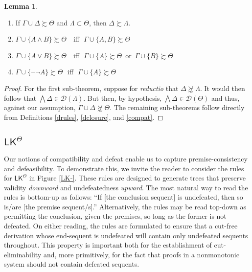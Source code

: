 \documentclass{article}
\theoremstyle{definition}
\theoremstyle{definition}
\theoremstyle{definition}
\newtheorem{lemma}{Lemma}
\theoremstyle{definition}
\theoremstyle{remark}
\theoremstyle{definition}
\theoremstyle{definition}
\begin{document}
\begin{lemma}\label{compatrel}
	
	\begin{enumerate}
		\item If $ \Gamma \cup \Delta \succsim \Theta$ and $ \Lambda \subset \Theta $, then $ \Delta \succsim \Lambda$.
		\item $ \Gamma \cup \{A \wedge B\} \succsim \Theta $ \,\, iff\,\,  $ \Gamma \cup \{A, B\} \succsim \Theta $
		\item $ \Gamma \cup \{A \vee B\} \succsim \Theta $ \,\, iff\,\,  $ \Gamma \cup \{A\} \succsim \Theta $ \,or\, $ \Gamma \cup \{B\} \succsim \Theta$
		\item $ \Gamma \cup \{\neg\neg A\} \succsim \Theta $ \,\,iff\,\,  $ \Gamma \cup \{A\} \succsim \Theta $
	\end{enumerate}
	
	\begin{proof}
		For the first sub-theorem, suppose for \textit{reductio} that $ \Delta \not\succsim \Lambda$. It would then follow that $ \bigwedge\Delta \in \mathcal{D}(\Lambda) $. But then, by hypothesis, $ \bigwedge\Delta \in \mathcal{D}(\Theta) $ and thus, against our assumption, $ \Gamma \cup \Delta \not\succsim \Theta $.  The remaining sub-theorems follow directly from Definitions \ref{drules}, \ref{dclosure}, and \ref{compat}.
	\end{proof}
	
\end{lemma}

\subsection{$ \mathsf{LK^\Theta}$}
Our notions of compatibility and defeat enable us to capture premise-consistency and defeasibility.  To demonstrate this, we invite the reader to consider the rules for $ \mathsf{LK^\Theta}$ in Figure \ref{LK-}. These rules are designed to generate trees that preserve validity \textit{downward} and undefeatedness \textit{upward}. The most natural way to read the rules is bottom-up as follows: ``If [the conclusion sequent] is undefeated, then so is/are [the premise sequent/s].'' Alternatively, the rules may be read top-down as permitting the conclusion, given the premises, so long as the former is not defeated. On either reading, the rules are formulated to ensure that a cut-free derivation whose end-sequent is undefeated will contain only undefeated sequents throughout. This property is important both for the establishment of cut-eliminability and, more primitively, for the fact that proofs in a nonmonotonic system should not contain defeated sequents.
\end{document}
